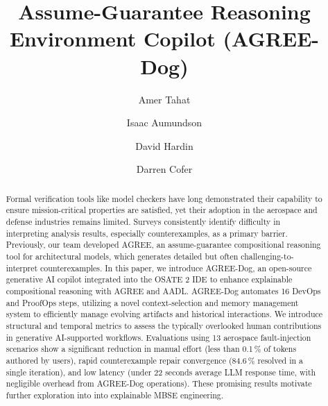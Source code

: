 \documentclass{llncs}
\begin{document}
%
\title{Assume-Guarantee Reasoning Environment Copilot (AGREE-Dog)}%
%
%
\author{Amer Tahat \and
  Isaac Aumundson \and
  David Hardin \and
  Darren Cofer}
%
%
%

\maketitle

\begin{abstract}
Formal verification tools like model checkers have long demonstrated their capability to ensure mission-critical properties are satisfied, yet their adoption in the aerospace and defense industries remains limited. Surveys consistently identify difficulty in interpreting analysis results, especially counterexamples, as a primary barrier. Previously, our team developed AGREE, an assume-guarantee compositional reasoning tool for architectural models, which generates detailed but often challenging-to-interpret counterexamples.
%
In this paper, we introduce AGREE-Dog, an open-source generative AI copilot integrated into the OSATE 2 IDE to enhance explainable compositional reasoning with AGREE and AADL. AGREE-Dog automates 16 DevOps and ProofOps steps, utilizing a novel context-selection and memory management system to efficiently manage evolving artifacts and historical interactions.
%
We introduce structural and temporal metrics to assess the typically overlooked human contributions in generative AI-supported workflows. Evaluations using 13 aerospace fault-injection scenarios show a significant reduction in manual effort (less than 0.1\,\% of tokens authored by users), rapid counterexample repair convergence (84.6\,\% resolved in a single iteration), and low latency (under 22 seconds average LLM response time, with negligible overhead from AGREE-Dog operations). %
These promising results motivate further exploration into into explainable MBSE engineering.
\end{abstract}
\end{document}
